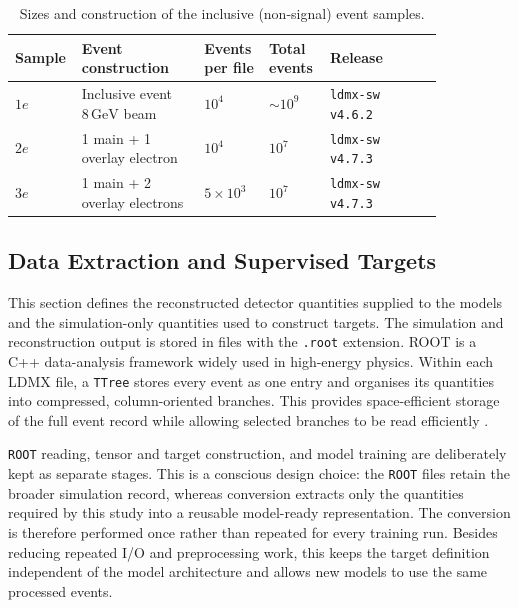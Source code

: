 \begin{table}[htbp]
    \centering
    \small
    \caption{Sizes and construction of the inclusive (non-signal) event samples.}
    \label{tab:dataset_summary}
    \begin{tabular}{p{0.07\linewidth} p{0.27\linewidth}
                    p{0.14\linewidth} p{0.12\linewidth}
                    p{0.25\linewidth}}
        \hline
        Sample & Event construction & Events per file & Total events &
        Release \\
        \hline
        \(1e\) & Inclusive event \(8\,\mathrm{GeV}\) beam &
        \(10^4\) & \(\sim10^9\) & \texttt{ldmx-sw v4.6.2} \\
        \(2e\) & 1 main + 1 overlay electron &
        \(10^4\) & \(10^7\) & \texttt{ldmx-sw v4.7.3} \\
        \(3e\) & 1 main + 2 overlay electrons &
        \(5\times10^3\) & \(10^7\) & \texttt{ldmx-sw v4.7.3} \\
        \hline
    \end{tabular}
\end{table}

\subsection{Data Extraction and Supervised Targets}
\label{sec:method_processing}

This section defines the reconstructed detector quantities supplied to the
models and the simulation-only quantities used to construct targets. The
simulation and reconstruction output is stored in files with the
\texttt{.root} extension. ROOT is a C++ data-analysis framework widely used in
high-energy physics. Within each LDMX file, a \texttt{TTree} stores every
event as one entry and organises its quantities into compressed,
column-oriented branches. This provides space-efficient storage of the full
event record while allowing selected branches to be read efficiently
\cite{ROOT_NIMA_1997,root_about,root_ttree}.

\texttt{ROOT} reading, tensor and target construction, and model training are
deliberately kept as separate stages. This is a conscious design choice: the
\texttt{ROOT} files retain the broader simulation record, whereas conversion
extracts only the quantities required by this study into a reusable
model-ready representation. The conversion is therefore performed once rather
than repeated for every training run. Besides reducing repeated I/O and
preprocessing work, this keeps the target definition independent of the model
architecture and allows new models to use the same processed events.

